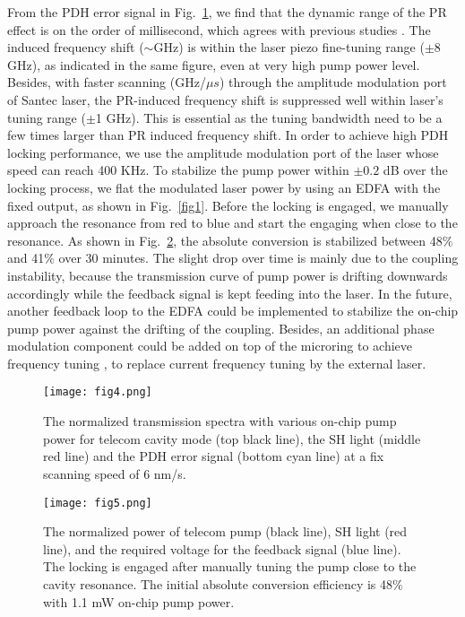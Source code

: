 \documentclass{WileyMSP-template}
\begin{document}
From the PDH error signal in Fig.~\ref{fig4}, we find that the dynamic range of the PR effect is on the order of millisecond, which agrees with previous studies \cite{sun2017nonlinear}. The induced frequency shift ($\sim$GHz) is within the laser piezo fine-tuning range ($\pm$8 GHz), as indicated in the same figure, even at very high pump power level. Besides, with faster scanning (GHz/$\mu s$) through the amplitude modulation port of Santec laser, the PR-induced frequency shift is suppressed well within laser's tuning range ($\pm$1 GHz). This is essential as the tuning bandwidth need to be a few times larger than PR induced frequency shift. In order to achieve high PDH locking performance, we use the amplitude modulation port of the laser whose speed can reach 400 KHz. To stabilize the pump power within $\pm 0.2 $ dB over the locking process, we flat the modulated laser power by using an EDFA with the fixed output, as shown in Fig.~\ref{fig1}. Before the locking is engaged, we manually approach the resonance from red to blue and start the engaging when close to the resonance. As shown in Fig.~\ref{fig5}, the absolute conversion is stabilized between 48$\%$ and 41$\%$ over 30 minutes. The slight drop over time is mainly due to the coupling instability, because the transmission curve of pump power is drifting downwards accordingly while the feedback signal is kept feeding into the laser. In the future, another feedback loop to the EDFA could be implemented to stabilize the on-chip pump power against the drifting of the coupling. Besides, an additional phase modulation component could be added on top of the microring to achieve frequency tuning \cite{Stefszky:21}, to replace current frequency tuning by the external laser.


\begin{figure}
  \texttt{[image: fig4.png]}
  \caption{The normalized transmission spectra with various on-chip pump power for telecom cavity mode (top black line), the SH light (middle red line) and the PDH error signal (bottom cyan line) at a fix scanning speed of 6 nm/s. }
  \label{fig4}
\end{figure}




\begin{figure}
  \texttt{[image: fig5.png]}
  \caption{The normalized power of telecom pump (black line), SH light (red line), and the required voltage for the feedback signal (blue line). The locking is engaged after manually tuning the pump close to the cavity resonance. The initial absolute conversion efficiency is 48$\%$ with 1.1 mW on-chip pump power.}
  \label{fig5}
\end{figure}
\end{document}
